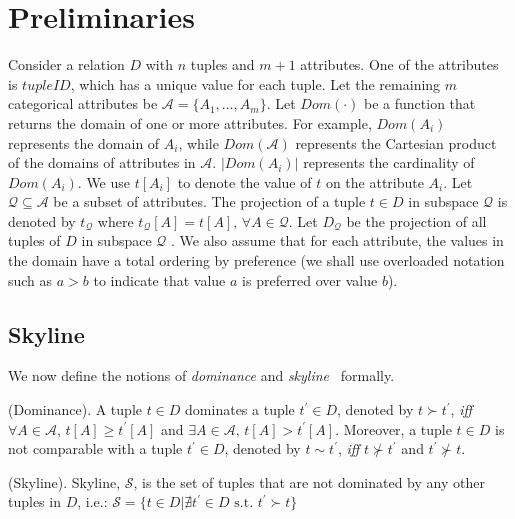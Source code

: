 \section{Preliminaries}\label{sec:preliminaries}
Consider a relation $D$ with $n$ tuples and $m+1$ attributes. 
One of the attributes is $tupleID$, which has a unique value for each tuple.
Let the remaining $m$ categorical attributes be $\mathcal{A}=\{A_1,\dots ,A_m\}$. 
Let $Dom(\cdot)$ be a function that returns the domain of one or more attributes. For example, $Dom(A_i)$ represents the
domain of $A_i$, while $Dom(\mathcal{A})$ represents the Cartesian product
of the domains of attributes in $\mathcal{A}$. $|Dom(A_i)|$ represents the cardinality of $Dom(A_i)$. We use $t[A_i]$ to denote the value of $t$ on the attribute $A_i$.  
Let $\mathcal{Q} \subseteq \mathcal{A}$ be a subset of attributes. The projection of a tuple $t \in D$ in subspace $\mathcal{Q}$ is denoted by $t_{\mathcal{Q}}$ where $t_{\mathcal{Q}}[A] = t[A], \, \forall A \in \mathcal{Q}$. Let $D_{\mathcal{Q}}$ be the projection of all tuples of $D$ in subspace $\mathcal{Q}$ . We also assume that for each attribute, the values in the domain have a total ordering by preference
(we shall  use overloaded notation such as $a > b$ to indicate that value $a$ is preferred over value $b$).

\vspace{-2mm}
\subsection{Skyline}
We now define the notions of \textit{dominance} %
and \textit{skyline}~\cite{borzsony2001skyline} formally. 

\begin{definition}{(Dominance).}
A tuple $t\in D$ dominates a tuple $t^\prime\in D$, denoted by $t \succ t^\prime$, {\it iff} $\forall A\in\mathcal{A},\, t[A] \geq t^\prime[A]$ and $\exists A \in \mathcal{A}, \, t[A] > t^\prime[A]$.
Moreover, a tuple $t\in D$ is not comparable with a tuple $t^\prime\in D$, denoted by $t \sim t^\prime$, {\it iff} $t \nsucc t^\prime$ and $t^\prime \nsucc t$.
\end{definition}

\begin{definition}{(Skyline).}
Skyline, $\mathcal{S}$, is the set of tuples  that are not dominated by any other tuples in $D$, i.e.: $\mathcal{S} = \{t\in D|\nexists t^\prime \in D \mbox{ s.t. } t^\prime \succ t\}$
\end{definition}

